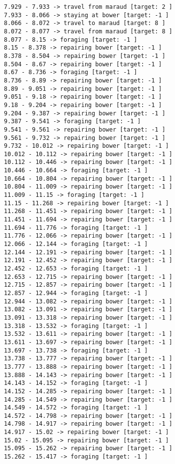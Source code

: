 \documentclass[11pt]{article}
\begin{document}
\begin{Verbatim}[commandchars=\\\{\}]
7.929 - 7.933 -> travel from maraud [target: 2 ]
7.933 - 8.066 -> staying at bower [target: -1 ]
8.066 - 8.072 -> travel to maraud [target: 8 ]
8.072 - 8.077 -> travel from maraud [target: 8 ]
8.077 - 8.15 -> foraging [target: -1 ]
8.15 - 8.378 -> repairing bower [target: -1 ]
8.378 - 8.504 -> repairing bower [target: -1 ]
8.504 - 8.67 -> repairing bower [target: -1 ]
8.67 - 8.736 -> foraging [target: -1 ]
8.736 - 8.89 -> repairing bower [target: -1 ]
8.89 - 9.051 -> repairing bower [target: -1 ]
9.051 - 9.18 -> repairing bower [target: -1 ]
9.18 - 9.204 -> repairing bower [target: -1 ]
9.204 - 9.387 -> repairing bower [target: -1 ]
9.387 - 9.541 -> foraging [target: -1 ]
9.541 - 9.561 -> repairing bower [target: -1 ]
9.561 - 9.732 -> repairing bower [target: -1 ]
9.732 - 10.012 -> repairing bower [target: -1 ]
10.012 - 10.112 -> repairing bower [target: -1 ]
10.112 - 10.446 -> repairing bower [target: -1 ]
10.446 - 10.664 -> foraging [target: -1 ]
10.664 - 10.804 -> repairing bower [target: -1 ]
10.804 - 11.009 -> repairing bower [target: -1 ]
11.009 - 11.15 -> foraging [target: -1 ]
11.15 - 11.268 -> repairing bower [target: -1 ]
11.268 - 11.451 -> repairing bower [target: -1 ]
11.451 - 11.694 -> repairing bower [target: -1 ]
11.694 - 11.776 -> foraging [target: -1 ]
11.776 - 12.066 -> repairing bower [target: -1 ]
12.066 - 12.144 -> foraging [target: -1 ]
12.144 - 12.191 -> repairing bower [target: -1 ]
12.191 - 12.452 -> repairing bower [target: -1 ]
12.452 - 12.653 -> foraging [target: -1 ]
12.653 - 12.715 -> repairing bower [target: -1 ]
12.715 - 12.857 -> repairing bower [target: -1 ]
12.857 - 12.944 -> foraging [target: -1 ]
12.944 - 13.082 -> repairing bower [target: -1 ]
13.082 - 13.091 -> repairing bower [target: -1 ]
13.091 - 13.318 -> repairing bower [target: -1 ]
13.318 - 13.532 -> foraging [target: -1 ]
13.532 - 13.611 -> repairing bower [target: -1 ]
13.611 - 13.697 -> repairing bower [target: -1 ]
13.697 - 13.738 -> foraging [target: -1 ]
13.738 - 13.777 -> repairing bower [target: -1 ]
13.777 - 13.888 -> repairing bower [target: -1 ]
13.888 - 14.143 -> repairing bower [target: -1 ]
14.143 - 14.152 -> foraging [target: -1 ]
14.152 - 14.285 -> repairing bower [target: -1 ]
14.285 - 14.549 -> repairing bower [target: -1 ]
14.549 - 14.572 -> foraging [target: -1 ]
14.572 - 14.798 -> repairing bower [target: -1 ]
14.798 - 14.917 -> repairing bower [target: -1 ]
14.917 - 15.02 -> repairing bower [target: -1 ]
15.02 - 15.095 -> repairing bower [target: -1 ]
15.095 - 15.262 -> repairing bower [target: -1 ]
15.262 - 15.417 -> foraging [target: -1 ]

\end{Verbatim}
\end{document}
